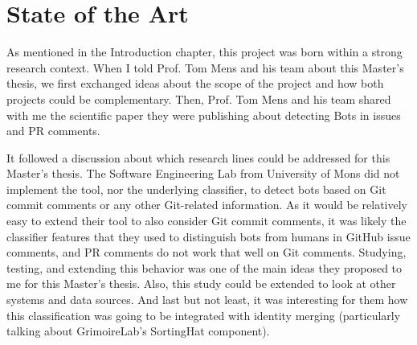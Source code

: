 \documentclass[a4paper, 12pt]{book}
\begin{document}

\cleardoublepage


\chapter{State of the Art}               %
\label{chap:state-art}

As mentioned in the Introduction chapter, this project was born within a strong research context. When I told Prof. Tom Mens and his team about this Master's thesis, we first exchanged ideas about the scope of the project and how both projects could be complementary. Then, Prof. Tom Mens and his team shared with me the scientific paper they were publishing about detecting Bots in issues and PR comments.

It followed a discussion about which research lines could be addressed for this Master's thesis. The Software Engineering Lab from University of Mons did not implement the tool, nor the underlying classifier, to detect bots based on Git commit comments or any other Git-related information. As it would be relatively easy to extend their tool to also consider Git commit comments, it was likely the classifier features that they used to distinguish bots from humans in GitHub issue comments, and PR comments do not work that well on Git comments. Studying, testing, and extending this behavior was one of the main ideas they proposed to me for this Master's thesis. Also, this study could be extended to look at other systems and data sources. And last but not least, it was interesting for them how this classification was going to be integrated with identity merging (particularly talking about GrimoireLab's SortingHat component).
\end{document}
